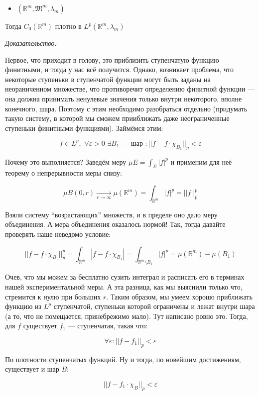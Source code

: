 \documentclass{article}
\def\dbl{\,\,}
\def\goesto#1{\underset{#1}{\longrightarrow}}
\begin{document}
\begin{itemize}
    \item $(\mathbb{R}^{m}, \mathfrak{M}^{m}, \lambda_m)$
\end{itemize}

Тогда $C_0(\mathbb{R}^{m})$ плотно в $L^{p}(\mathbb{R}^{m}, \lambda_m)$

\textit{Доказательство:}

Первое, что приходит в голову, это приблизить ступенчатую функцию финитными, и тогда у нас всё получится. Однако, возникает проблема, что некоторые ступеньки в ступенчатой функции могут быть заданы на неораниченном множестве, что противоречит определению финитной функции --- она должна принимать ненулевые значения только внутри некоторого, вполне конечного, шара. Поэтому с этим необходимо разобраться отдельно (придумать такую систему, в которой мы сможем прииближать даже неограниченные ступеньки финитными функциями). Займёмся этим:

\[f \in L^p, \dbl \forall \varepsilon > 0 \dbl \exists B_1 \text{ --- шар }: ||f - f \cdot \chi_{B_1}||_p < \varepsilon\]

Почему это выполняется? Заведём меру $\mu E = \int_{E} |f|^p$ и применим для неё теорему о непрерывности меры снизу:

\[\mu B(0, r) \goesto{r \rightarrow \infty} \mu(\mathbb{R}^m) = \int_{\mathbb{R}^m} |f|^p = ||f||_p^p\]

Взяли систему ``возрастающих'' множеств, и в пределе оно дало меру объединения. А мера объединения оказалось нормой! Так, тогда давайте проверять наше неведомо условие:

\[||f - f \cdot \chi_{B_1}||_p^p = \int_{\mathbb{R}^m} |f - f \cdot \chi_{B_1}| = \int_{\mathbb{R}^m \setminus B_1} |f|^p = \mu(\mathbb{R}^m) - \mu(B_1)\]

Очев, что мы можем за бесплатно сузить интеграл и расписать его в терминах нашей экспериментальной меры. А эта разница, как мы выяснили только что, стремится к нулю при больших $r$. Таким образом, мы умеем хорошо приближать функцию из $L^p$ ступенчатой, ступеньки которой ограничены и лежат внутри шара (а то, что не помещается, принебрежимо мало). Тут написано ровно это. Тогда, для $f$ существует $f_1$ --- ступенчатая, такая что:

\[\forall \varepsilon: ||f - f_1||_p < \varepsilon\]

По плотности ступенчатых функций. Ну и тогда, по новейшим достижениям, существует и шар $B$:

\[||f - f_1 \cdot \chi_{B}||_p < \varepsilon\]
\end{document}
